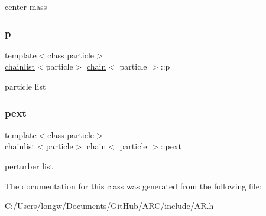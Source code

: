 center mass 

\hypertarget{classchain_a1962dd942432d4f43b5f26e292fa4836}{}\label{classchain_a1962dd942432d4f43b5f26e292fa4836} 
\subsubsection{\texorpdfstring{p}{p}}
{\footnotesize\ttfamily template$<$class particle$>$ \\
\hyperlink{classchainlist}{chainlist}$<$particle$>$ \hyperlink{classchain}{chain}$<$ particle $>$\+::p}



particle list 

\hypertarget{classchain_ad26d11d20934a500df042ecf333a3f72}{}\label{classchain_ad26d11d20934a500df042ecf333a3f72} 
\subsubsection{\texorpdfstring{pext}{pext}}
{\footnotesize\ttfamily template$<$class particle$>$ \\
\hyperlink{classchainlist}{chainlist}$<$particle$>$ \hyperlink{classchain}{chain}$<$ particle $>$\+::pext}



perturber list 



The documentation for this class was generated from the following file\+:\begin{DoxyCompactItemize}
\item 
C\+:/\+Users/longw/\+Documents/\+Git\+Hub/\+A\+R\+C/include/\hyperlink{AR_8h}{A\+R.\+h}\end{DoxyCompactItemize}
